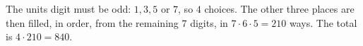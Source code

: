 The units digit must be odd: $1,3,5$ or $7$, so $4$ choices. The other three places are then filled, in order, from the remaining $7$ digits, in $7\cdot6\cdot5=210$ ways. The total is $4\cdot210=\boxed{840}$.
